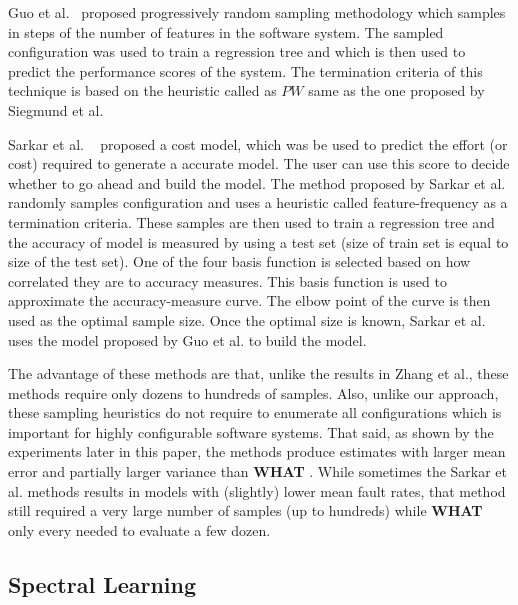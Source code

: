 \documentclass{sig-alternative}
\newcommand{\what}{{\bf WHAT }}
\begin{document}
Guo et al.~\cite{guo2013variability} proposed progressively random sampling methodology which samples in steps of the number of features in the software system. The sampled configuration was used to train a regression tree and which is then used to predict the performance scores of the system. The termination criteria of this technique is based on the heuristic called as $PW$ same as the one proposed by Siegmund et al. 

Sarkar et al. ~\cite{sarkar2015cost} proposed a cost model, which was be used to predict the effort (or cost) required to generate a accurate model. The user can use this score to decide whether to go ahead and build the model. The method proposed by Sarkar et al. randomly samples configuration and uses a heuristic called feature-frequency as a termination criteria. These samples are then used to train a regression tree and the accuracy of model is measured by using a test set (size of train set is equal to size of the test set). One of the four basis function is selected based on how correlated they are to  accuracy measures. This basis function is used to approximate the accuracy-measure curve. The elbow point of the curve is then used as the optimal sample size. Once the optimal size is known, Sarkar et al. uses the model proposed by Guo et al. to build the model.  


The advantage of these methods are that, unlike  the results in Zhang et al., these  methods require only dozens to hundreds of samples. Also, unlike our approach, these sampling heuristics do not require to enumerate all configurations which is important for highly configurable software systems. 
That said, as shown by the experiments later in this paper, the  methods produce estimates with  larger mean error and partially larger variance than   \what. While sometimes the  Sarkar et al. methods results in  models with (slightly)
lower mean fault rates, that method still required a very  large number of samples (up to hundreds) while \what only every needed to evaluate a  few dozen.
 

\subsection{Spectral Learning}\label{sect:spect}
\end{document}
